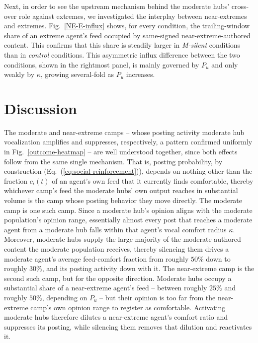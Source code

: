 \documentclass{svproc}
\def\VCR{\kappa}                 %
\begin{document}
Next, in order to see the upstream mechanism behind the
moderate hubs' cross-over role against extremes,
we investigated the interplay between near-extremes and
extremes.
Fig.~\ref{NE-E-influx} shows, for every condition, the trailing-window
share of an extreme agent's feed occupied by same-signed near-extreme-authored
content. This confirms that this share is steadily larger in
\emph{M-silent} conditions than in \emph{control} conditions.
This asymmetric influx difference between the two conditions,
shown in the rightmost panel, is mainly governed by $P_u$ and only
weakly by $\VCR$, growing several-fold as $P_u$ increases.

\section{Discussion}\label{sec:discussion}

The moderate and near-extreme camps -- whose posting activity
moderate hub vocalization amplifies and suppresses, respectively, a
pattern confirmed uniformly in Fig.~\ref{outcome-heatmap} -- are
well understood together, since both effects follow from the same
single mechanism. That is, posting probability, by construction
(Eq.~(\ref{eq:social-reinforcement})), depends on nothing other
than the fraction $c_i(t)$ of an agent's own feed that it currently
finds comfortable, thereby whichever camp's feed the moderate hubs' own
output reaches in substantial volume is the camp whose posting
behavior they move directly. The moderate camp is one such camp. 
Since a
moderate hub's opinion aligns with the moderate population's
opinion range, essentially almost every post that reaches a moderate
agent from a moderate hub falls within that agent's vocal comfort
radius $\VCR$. 
Moreover, moderate hubs supply the large majority of
the moderate-authored content the moderate population receives, thereby
silencing them drives a moderate agent's average feed-comfort
fraction from roughly $50\%$ down to roughly $30\%$, and its
posting activity down with it. The near-extreme camp is the second
such camp, but for the opposite direction. Moderate hubs occupy a
substantial share of a near-extreme agent's feed -- between roughly
$25\%$ and roughly $50\%$, depending on $P_u$ -- but their
opinion is too far from the
near-extreme camp's own opinion range to register as comfortable.
Activating moderate hubs therefore dilutes a near-extreme agent's
comfort ratio and suppresses its posting, while silencing them
removes that dilution and reactivates it.
\end{document}
